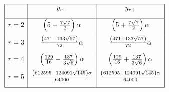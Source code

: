 \documentclass[12pt]{article}
\numberwithin{equation}{section}
\begin{document}
 \begin{align}\label{branch pts Case2 table}
 \begin{array}{|l|c|c|ll}
 \hline
& {y}_{r-}& {y}_{r+}\\[0.3cm]\hline
r=2 & \left(5-\frac{7
   \sqrt{7}}{2}\right) \alpha 
   & \left(5+\frac{7
   \sqrt{7}}{2}\right) \alpha  \\[0.3cm]
r=3   &
   \frac{\left(471-133 \sqrt{57}\right)}{72}  \alpha
   &  \frac{\left(471+133 \sqrt{57}\right) }{72} \alpha \\[0.3cm]
r=4  & 
   \left(\frac{129}{16}-\frac{137}{3 \sqrt{6}}\right) \alpha
   & \left(\frac{129}{16} +\frac{137}{3 \sqrt{6}}\right) \alpha\\[0.3cm]
r=5 & \frac{\left(612595-124091 \sqrt{145}\right) \alpha }{64000}& 
   \frac{\left(612595+124091 \sqrt{145}\right) \alpha }{64000} \\[0.3cm] \hline
   \end{array}
 \end{align}
\end{document}
